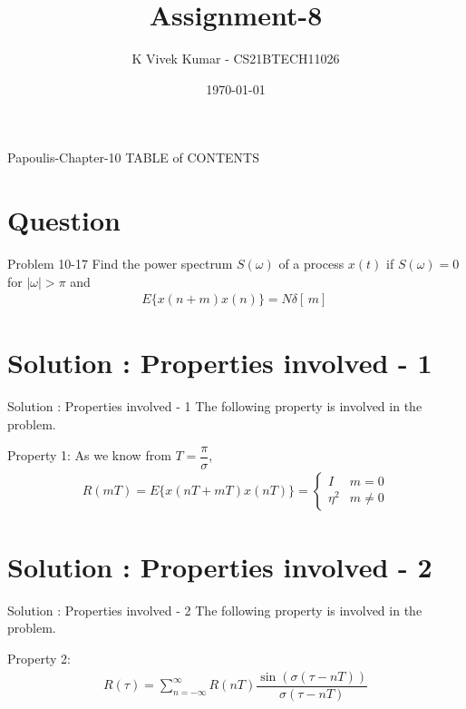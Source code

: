 \documentclass{beamer}
\title{Assignment-8}
\author{K Vivek Kumar - CS21BTECH11026}
\date{\today}
\begin{document}
\begin{frame}
    \titlepage 
\end{frame}

\logo{}


\begin{frame}{Papoulis-Chapter-10}
TABLE of CONTENTS
    \tableofcontents
\end{frame}


\section{Question}
\begin{frame}{Problem 10-17}
Find the power spectrum $S(\omega)$ of a process $x(t)$ if $S(\omega)=0$ for $\lvert\omega\rvert>\pi$ and
	\begin{align*}
	E\{x(n+m)x(n)\}=N\delta[\,m]\,
	\end{align*}
\end{frame}


\section{Solution : Properties involved - 1}
\begin{frame}{Solution : Properties involved - 1}
The following property is involved in the problem.\\
\begin{block}{Property 1:}
As we know from $T=\dfrac{\pi}{\sigma}$,
\begin{align}
	R(mT)=E\{x(nT+mT)x(nT)\}=\begin{cases}
	I & m=0\\
	\eta^{2} & m \neq 0
	\end{cases}
	\end{align}
    \end{block}
\end{frame} 
\section{Solution : Properties involved - 2}
\begin{frame}{Solution : Properties involved - 2}
The following property is involved in the problem.\\
\begin{block}{Property 2:} \begin{align}
	R(\tau)=\sum_{n=-\infty}^{\infty}R(nT)\dfrac{\sin(\sigma(\tau-nT))}{\sigma(\tau-nT)}
	\end{align}
    \end{block}
\end{frame}
\end{document}
